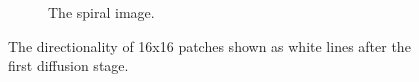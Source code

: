 \begin{figure}[h]
\begin{subfigure}[b]{0.49\textwidth}
		\caption{The spiral image.}
		\label{fig:spiral}
	\end{subfigure}
	
	\caption{The directionality of 16x16 patches shown as white lines after the first diffusion stage.}
	\label{fig:directionality}
\end{figure}